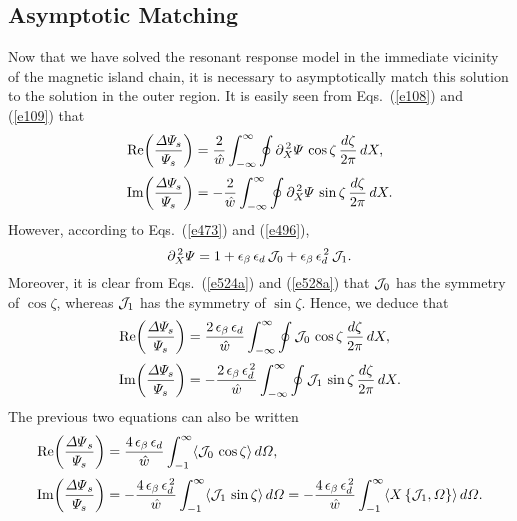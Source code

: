 \documentclass[12pt,prb,aps]{revtex4-1}
\begin{document}
\subsection{Asymptotic Matching}
Now that we have solved the resonant response model in the immediate vicinity of the magnetic island chain, it is
necessary to asymptotically match this solution to the solution in the outer region. 
It is easily seen from Eqs.~(\ref{e108}) and (\ref{e109}) that\,\cite{fw} 
\begin{align}
{\rm Re}\!\left(\frac{{\mit\Delta}{\mit\Psi}_s}{{\mit\Psi}_s}\right)&=\frac{2}{\hat{w}}\int_{-\infty}^{\infty}\oint
\partial_X^{\,2}{\mit\Psi}\,\cos\zeta\,\frac{d\zeta}{2\pi}\,dX,\\[0.5ex]
{\rm Im}\!\left(\frac{{\mit\Delta}{\mit\Psi}_s}{{\mit\Psi}_s}\right)&=-\frac{2}{\hat{w}}\int_{-\infty}^{\infty}\oint
\partial_X^{\,2}{\mit\Psi}\,\sin\zeta\,\frac{d\zeta}{2\pi}\,dX.
\end{align}
However, according to Eqs.~(\ref{e473}) and (\ref{e496}),
\begin{equation}
\partial_X^{\,2}{\mit\Psi} = 1 + \epsilon_\beta\,\epsilon_d\,{\cal J}_0 + \epsilon_\beta\,\epsilon_d^{\,2}\,{\cal J}_1.
\end{equation}
Moreover, it is clear from Eqs.~(\ref{e524a}) and (\ref{e528a}) that ${\cal J}_0$ has the symmetry of $\cos\zeta$,
whereas ${\cal J}_1$ has the symmetry of $\sin\zeta$. 
Hence, we deduce that
\begin{align}
{\rm Re}\!\left(\frac{{\mit\Delta}{\mit\Psi}_s}{{\mit\Psi}_s}\right)&=\frac{2\,\epsilon_\beta\,\epsilon_d}{\hat{w}}\int_{-\infty}^{\infty}\oint
{\cal J}_0\,\cos\zeta\,\frac{d\zeta}{2\pi}\,dX,\\[0.5ex]
{\rm Im}\!\left(\frac{{\mit\Delta}{\mit\Psi}_s}{{\mit\Psi}_s}\right)&=-\frac{2\,\epsilon_\beta\,\epsilon_d^{\,2}}{\hat{w}}\int_{-\infty}^{\infty}\oint
{\cal J}_1\,\sin\zeta\,\frac{d\zeta}{2\pi}\,dX.
\end{align}
The previous two equations can also be written
\begin{align}
{\rm Re}\!\left(\frac{{\mit\Delta\Psi}_s}{{\mit\Psi}_s}\right)&=\frac{4\,\epsilon_\beta\,\epsilon_d}{\hat{w}}\int_{-1}^\infty
\langle {\cal J}_0\,\cos\zeta\rangle\,d{\mit\Omega},\label{e542}\\[0.5ex]
{\rm Im}\!\left(\frac{{\mit\Delta\Psi}_s}{{\mit\Psi}_s}\right)&=-\frac{4\,\epsilon_\beta\,\epsilon_d^{\,2}}{\hat{w}}\int_{-1}^\infty
\langle {\cal J}_1\,\sin\zeta\rangle\,d{\mit\Omega}=-\frac{4\,\epsilon_\beta\,\epsilon_d^{\,2}}{\hat{w}}\int_{-1}^\infty
\langle X\,\{{\cal J}_1,{\mit\Omega}\}\rangle\,d{\mit\Omega}.\label{e543}
\end{align}
\end{document}
